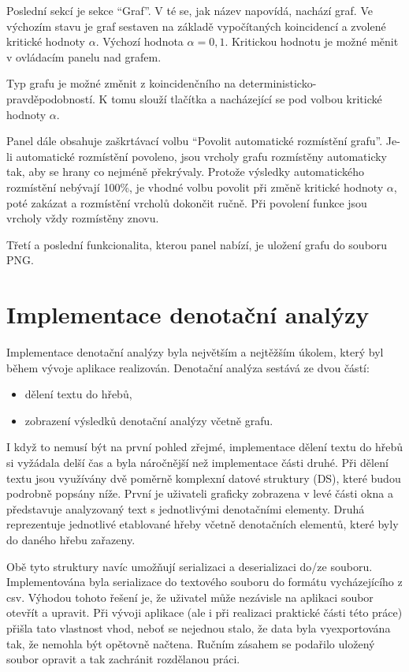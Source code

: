 \documentclass[dp.tex]{subfiles}
\begin{document}
Poslední sekcí je sekce \enquote{Graf}. V té se, jak název napovídá, nachází graf. Ve výchozím stavu je graf sestaven na základě vypočítaných koincidencí a zvolené kritické hodnoty $\alpha$. Výchozí hodnota $\alpha = 0,1$. Kritickou hodnotu je možné měnit v ovládacím panelu nad grafem. 

Typ grafu je možné změnit z koincidenčního na deterministicko-pravděpodobností. K tomu slouží tlačítka  a  nacházející se pod volbou kritické hodnoty $\alpha$. 

Panel dále obsahuje zaškrtávací volbu \enquote{Povolit automatické rozmístění grafu}. Je-li automatické rozmístění povoleno, jsou vrcholy grafu rozmístěny automaticky tak, aby se hrany co nejméně překrývaly. Protože výsledky automatického rozmístění nebývají 100\%, je vhodné volbu povolit při změně kritické hodnoty $\alpha$, poté zakázat a rozmístění vrcholů dokončit ručně. Při povolení funkce jsou vrcholy vždy rozmístěny znovu.

Třetí a poslední funkcionalita, kterou panel nabízí, je uložení grafu do souboru PNG.

\section{Implementace denotační analýzy}

Implementace denotační analýzy byla největším a nejtěžším úkolem, který byl během vývoje aplikace realizován. Denotační analýza sestává ze dvou částí:
\begin{itemize}
\item dělení textu do hřebů,
\item zobrazení výsledků denotační analýzy včetně grafu.
\end{itemize}

I když to nemusí být na první pohled zřejmé, implementace dělení textu do hřebů si vyžádala delší čas a byla náročnější než implementace části druhé. Při dělení textu jsou využívány dvě poměrně komplexní datové struktury (DS), které budou podrobně popsány níže. První je uživateli graficky zobrazena v levé části okna a představuje analyzovaný text s jednotlivými denotačními elementy. Druhá reprezentuje jednotlivé etablované hřeby včetně denotačních elementů, které byly do daného hřebu zařazeny. 

Obě tyto struktury navíc umožňují serializaci a deserializaci do/ze souboru. Implementována byla serializace do textového souboru do formátu vycházejícího z \acrshort{csv}. Výhodou tohoto řešení je, že uživatel může nezávisle na aplikaci soubor otevřít a upravit. Při vývoji aplikace (ale i při realizaci praktické části této práce) přišla tato vlastnost vhod, neboť se nejednou stalo, že data byla vyexportována tak, že nemohla být opětovně načtena. Ručním zásahem se podařilo uložený soubor opravit a tak zachránit rozdělanou práci.
\end{document}
